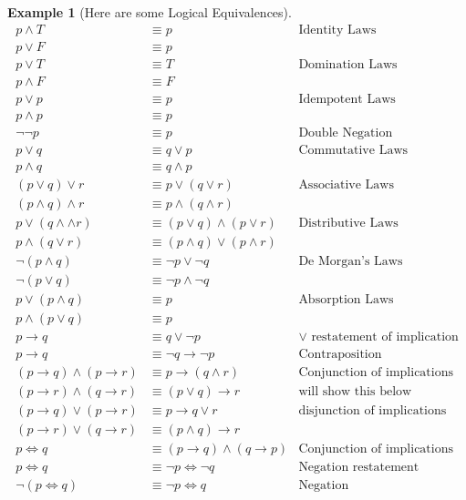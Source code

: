 \documentclass[letterpaper,10pt]{article}
\theoremstyle{plain}
\theoremstyle{definition}
\newtheorem{exmp}[thm]{Example}
\theoremstyle{remark}
\providecommand{\land}{\ensuremath{\wedge}}
\providecommand{\lor}{\ensuremath{\vee}}
\begin{document}
\begin{exmp}[Here are some Logical Equivalences]
\begin{align}
p \land T &\equiv p  & \text{Identity Laws}\\
p \lor F &\equiv p  & \\
p \lor T & \equiv T & \text{Domination Laws}\\
p \land F & \equiv F & \\
p \lor p & \equiv p & \text{Idempotent Laws}\\
p \land p & \equiv p & \\
\lnot \lnot p & \equiv p & \text{Double Negation}\\
p \lor q & \equiv q \lor p & \text{Commutative Laws}\\
p \land q & \equiv q \land p & \\
(p \lor q) \lor r & \equiv p \lor (q \lor r) & \text{Associative Laws}\\
(p \land q) \land r & \equiv p \land (q \land r) \\
p \lor (q\land\land r) & \equiv (p \lor q ) \land 
 (p \lor r)  & \text{Distributive Laws}\\
p \land (q\lor r) & \equiv (p \land q) \lor (p \land r) & \\
\lnot (p\land q) & \equiv \lnot p \lor \lnot q & \text{De Morgan's Laws}\\
\lnot (p\lor q) & \equiv \lnot p \land \lnot q & \\
p \lor (p \land q) & \equiv p & \text{Absorption Laws}\\
p \land (p \lor q)& \equiv p &\\
p \to q & \equiv q \lor \lnot p   & \text{$\lor$ restatement of implication}\\
p \to q & \equiv \lnot q \to \lnot p & \text{Contraposition}\\
(p \to q) \land (p \to r) &\equiv p\to (q \land r)& \text{Conjunction of implications}\\
(p \to r) \land (q \to r) &\equiv (p \lor q) \to r & \text{will show this below}  \\ 
(p \to q) \lor (p \to r) &\equiv p\to q \lor r& \text{disjunction of implications}\\
(p \to r) \lor (q \to r) &\equiv (p\land q)\to r\\
p \iff q & \equiv (p\to q)\land(q\to p)  & \text{Conjunction of implications}\\
p \iff q & \equiv \lnot p \iff \lnot q  & \text{Negation restatement}\\
\lnot(p \iff q) & \equiv \lnot p \iff q  & \text{Negation}
\end{align}
\end{exmp}
\end{document}
